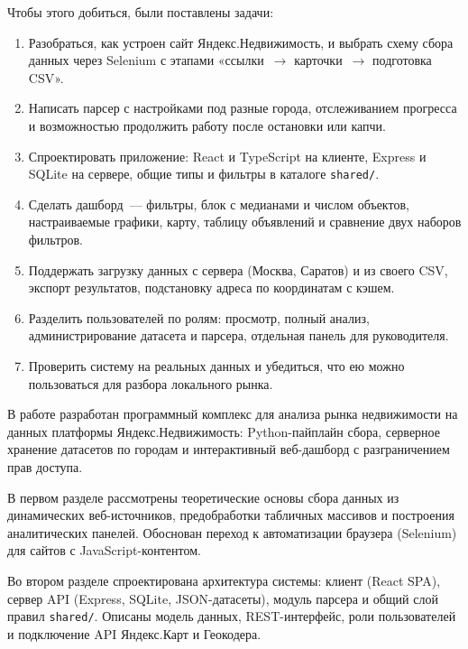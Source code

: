 \documentclass[coursework]{SCWorks}
\begin{document}
Чтобы этого добиться, были поставлены задачи:
\begin{enumerate}
    \item Разобраться, как устроен сайт Яндекс.Недвижимость, и выбрать схему сбора данных через Selenium с этапами «ссылки~$\rightarrow$ карточки~$\rightarrow$ подготовка CSV».
    \item Написать парсер с настройками под разные города, отслеживанием прогресса и возможностью продолжить работу после остановки или капчи.
    \item Спроектировать приложение: React и TypeScript на клиенте, Express и SQLite на сервере, общие типы и фильтры в каталоге \texttt{shared/}.
    \item Сделать дашборд~--- фильтры, блок с медианами и числом объектов, настраиваемые графики, карту, таблицу объявлений и сравнение двух наборов фильтров.
    \item Поддержать загрузку данных с сервера (Москва, Саратов) и из своего CSV, экспорт результатов, подстановку адреса по координатам с кэшем.
    \item Разделить пользователей по ролям: просмотр, полный анализ, администрирование датасета и парсера, отдельная панель для руководителя.
    \item Проверить систему на реальных данных и убедиться, что ею можно пользоваться для разбора локального рынка.
\end{enumerate}









\conclusion

В работе разработан программный комплекс для анализа рынка недвижимости на данных платформы Яндекс.Недвижимость: Python-пайплайн сбора, серверное хранение датасетов по городам и интерактивный веб-дашборд с разграничением прав доступа.

В первом разделе рассмотрены теоретические основы сбора данных из динамических веб-источников, предобработки табличных массивов и построения аналитических панелей. Обоснован переход к автоматизации браузера (Selenium) для сайтов с JavaScript-контентом.

Во втором разделе спроектирована архитектура системы: клиент (React SPA), сервер API (Express, SQLite, JSON-датасеты), модуль парсера и общий слой правил \texttt{shared/}. Описаны модель данных, REST-интерфейс, роли пользователей и подключение API Яндекс.Карт и Геокодера.
\end{document}
